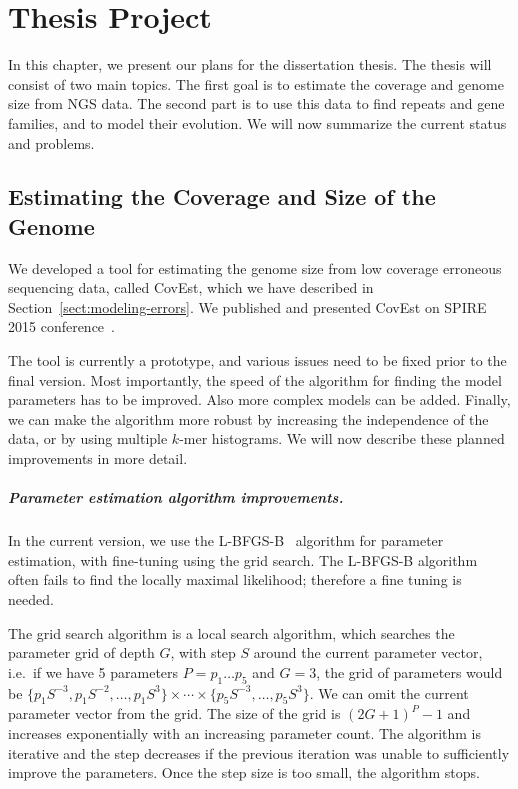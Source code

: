 \chapter{Thesis Project}

In this chapter, we present our plans for the dissertation thesis.
The thesis will consist of two main topics.
The first goal is to estimate the coverage and genome size from NGS data. The second part is to use this data to find repeats and gene families, and to model their evolution.
We will now summarize the current status and problems.

\section{Estimating the Coverage and Size of the Genome}

We developed a tool for estimating the genome size from low coverage erroneous sequencing data, called CovEst, which we have described in Section~\ref{sect:modeling-errors}. We published and presented CovEst on SPIRE 2015 conference~\cite{covest}.

The tool is currently a prototype, and various issues need to be fixed prior to the final version.
Most importantly, the speed of the algorithm for finding the model parameters has to be improved. Also more complex models can be added. Finally, we can make the algorithm more robust by increasing the independence of the data, or by using multiple $k$-mer histograms.
We will now describe these planned improvements in more detail.

\paragraph{Parameter estimation algorithm improvements.}
In the current version, we use the L-BFGS-B~\cite{l-bfgs-b} algorithm for parameter estimation, with fine-tuning using the grid search.
The L-BFGS-B algorithm often fails to find the locally maximal likelihood; therefore a fine tuning is needed.

The grid search algorithm is a local search algorithm, which searches the parameter grid of depth $G$, with step $S$ around the current parameter vector, i.e.\ if we have 5 parameters $P = p_1\dots p_5$ and $G = 3$, the grid of parameters would be $\{p_1 S^{-3}, p_1 S^{-2}, \dots, p_1 S^3\} \times \cdots \times \{p_5 S^{-3}, \dots, p_5 S^3\}$. We can omit the current parameter vector from the grid. The size of the grid is ${(2G + 1)}^P - 1$ and increases exponentially with an increasing parameter count. The algorithm is iterative and the step decreases if the previous iteration was unable to sufficiently improve the parameters. Once the step size is too small, the algorithm stops.

